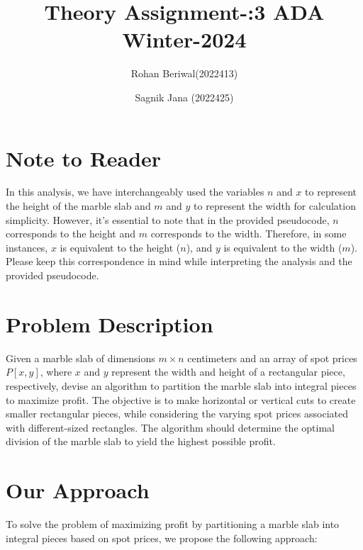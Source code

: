 \documentclass{article}
\title{Theory Assignment-:3 ADA Winter-2024}
\author{Rohan Beriwal(2022413) \and Sagnik Jana (2022425)}
\begin{document}
\maketitle

\section*{Note to Reader}
In this analysis, we have interchangeably used the variables $n$ and $x$ to represent the height of the marble slab and $m$ and $y$ to represent the width for calculation simplicity. However, it's essential to note that in the provided pseudocode, $n$ corresponds to the height and $m$ corresponds to the width. Therefore, in some instances, $x$ is equivalent to the height ($n$), and $y$ is equivalent to the width ($m$). Please keep this correspondence in mind while interpreting the analysis and the provided pseudocode.

\section*{Problem Description}
Given a marble slab of dimensions $m \times n$ centimeters and an array of spot prices $P[x, y]$, where $x$ and $y$ represent the width and height of a rectangular piece, respectively, devise an algorithm to partition the marble slab into integral pieces to maximize profit. The objective is to make horizontal or vertical cuts to create smaller rectangular pieces, while considering the varying spot prices associated with different-sized rectangles. The algorithm should determine the optimal division of the marble slab to yield the highest possible profit.


\section{Our Approach}

To solve the problem of maximizing profit by partitioning a marble slab into integral pieces based on spot prices, we propose the following approach:
\end{document}
